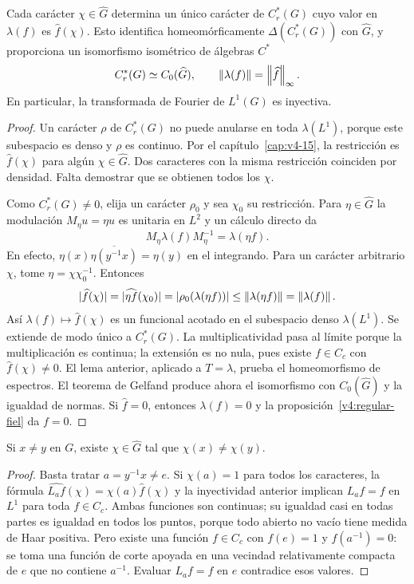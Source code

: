 \begin{teorema}\label{v4:cstar-fourier}
Cada carácter $\chi\in\widehat G$ determina un único carácter de $C_r^*(G)$ cuyo valor en $\lambda(f)$ es $\widehat f(\chi)$. Esto identifica homeomórficamente $\Delta(C_r^*(G))$ con $\widehat G$, y proporciona un isomorfismo isométrico de álgebras $C^*$
\[
 C_r^*(G)\simeq C_0(\widehat G),\qquad
 \left\lVert\lambda(f)\right\rVert=\left\lVert\widehat f\right\rVert_\infty.
\]
En particular, la transformada de Fourier de $L^1(G)$ es inyectiva.
\end{teorema}
\begin{proof}
Un carácter $\rho$ de $C_r^*(G)$ no puede anularse en toda $\lambda(L^1)$, porque este subespacio es denso y $\rho$ es continuo. Por el capítulo~\ref{cap:v4-15}, la restricción es $\widehat f(\chi)$ para algún $\chi\in\widehat G$. Dos caracteres con la misma restricción coinciden por densidad. Falta demostrar que se obtienen todos los $\chi$.

Como $C_r^*(G)\ne0$, elija un carácter $\rho_0$ y sea $\chi_0$ su restricción. Para $\eta\in\widehat G$ la modulación $M_\eta u=\eta u$ es unitaria en $L^2$ y un cálculo directo da
\[
 M_\eta\lambda(f)M_\eta^{-1}=\lambda(\eta f).
\]
En efecto, $\eta(x)\overline{\eta(y^{-1}x)}=\eta(y)$ en el integrando. Para un carácter arbitrario $\chi$, tome $\eta=\chi\chi_0^{-1}$. Entonces
\[
 |\widehat f(\chi)|
 =|\widehat{\eta f}(\chi_0)|
 =|\rho_0(\lambda(\eta f))|
 \le\left\lVert\lambda(\eta f)\right\rVert=\left\lVert\lambda(f)\right\rVert.
\]
Así $\lambda(f)\mapsto\widehat f(\chi)$ es un funcional acotado en el subespacio denso $\lambda(L^1)$. Se extiende de modo único a $C_r^*(G)$. La multiplicatividad pasa al límite porque la multiplicación es continua; la extensión es no nula, pues existe $f\in C_c$ con $\widehat f(\chi)\ne0$. El lema anterior, aplicado a $T=\lambda$, prueba el homeomorfismo de espectros. El teorema de Gelfand produce ahora el isomorfismo con $C_0(\widehat G)$ y la igualdad de normas. Si $\widehat f=0$, entonces $\lambda(f)=0$ y la proposición~\ref{v4:regular-fiel} da $f=0$.
\end{proof}

\begin{corolario}\label{v4:caracteres-separan}
Si $x\ne y$ en $G$, existe $\chi\in\widehat G$ tal que $\chi(x)\ne\chi(y)$.
\end{corolario}
\begin{proof}
Basta tratar $a=y^{-1}x\ne e$. Si $\chi(a)=1$ para todos los caracteres, la fórmula $\widehat{L_af}(\chi)=\chi(a)\widehat f(\chi)$ y la inyectividad anterior implican $L_af=f$ en $L^1$ para toda $f\in C_c$. Ambas funciones son continuas; su igualdad casi en todas partes es igualdad en todos los puntos, porque todo abierto no vacío tiene medida de Haar positiva. Pero existe una función $f\in C_c$ con $f(e)=1$ y $f(a^{-1})=0$: se toma una función de corte apoyada en una vecindad relativamente compacta de $e$ que no contiene $a^{-1}$. Evaluar $L_af=f$ en $e$ contradice esos valores.
\end{proof}

